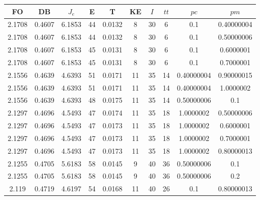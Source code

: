 \begin{table}[h!]
    \footnotesize
    \begin{center}
        \begin{tabular}{|c|c|c|c|c|c|c|c|c|c|}
        \hline
            {\bf FO} & {\bf DB} & $J_e$ & {\bf E} & {\bf T} & {\bf KE} & $I$ & $tt$ & $pc$ & $pm$ \\
        \hline
        \hline
            2.1708 & 0.4607  & 6.1853 & 44 & 0.0132 & 8 & 30 & 6 & 0.1 & 0.40000004\\
        \hline
        \hline
            2.1708 & 0.4607  & 6.1853 & 44 & 0.0132 & 8 & 30 & 6 & 0.1 & 0.50000006\\
        \hline
        \hline
            2.1708 & 0.4607  & 6.1853 & 45 & 0.0131 & 8 & 30 & 6 & 0.1 & 0.6000001\\
        \hline
        \hline
            2.1708 & 0.4607  & 6.1853 & 45 & 0.0131 & 8 & 30 & 6 & 0.1 & 0.7000001\\
        \hline
        \hline
            2.1556 & 0.4639  & 4.6393 & 51 & 0.0171 & 11 & 35 & 14 & 0.40000004 & 0.90000015\\
        \hline
        \hline
            2.1556 & 0.4639  & 4.6393 & 51 & 0.0171 & 11 & 35 & 14 & 0.40000004 & 1.0000002\\
        \hline
        \hline
            2.1556 & 0.4639  & 4.6393 & 48 & 0.0175 & 11 & 35 & 14 & 0.50000006 & 0.1\\
        \hline
        \hline
            2.1297 & 0.4696  & 4.5493 & 47 & 0.0174 & 11 & 35 & 18 & 1.0000002 & 0.50000006\\
        \hline
        \hline
            2.1297 & 0.4696  & 4.5493 & 47 & 0.0173 & 11 & 35 & 18 & 1.0000002 & 0.6000001\\
        \hline
        \hline
            2.1297 & 0.4696  & 4.5493 & 47 & 0.0173 & 11 & 35 & 18 & 1.0000002 & 0.7000001\\
        \hline
        \hline
            2.1297 & 0.4696  & 4.5493 & 47 & 0.0173 & 11 & 35 & 18 & 1.0000002 & 0.80000013\\
        \hline
        \hline
            2.1255 & 0.4705  & 5.6183 & 58 & 0.0145 & 9 & 40 & 36 & 0.50000006 & 0.1\\
        \hline
        \hline
            2.1255 & 0.4705  & 5.6183 & 58 & 0.0145 & 9 & 40 & 36 & 0.50000006 & 0.2\\
        \hline
        \hline
            2.119 & 0.4719  & 4.6197 & 54 & 0.0168 & 11 & 40 & 26 & 0.1 & 0.80000013\\

\end{tabular}
\end{center}
\end{table}
